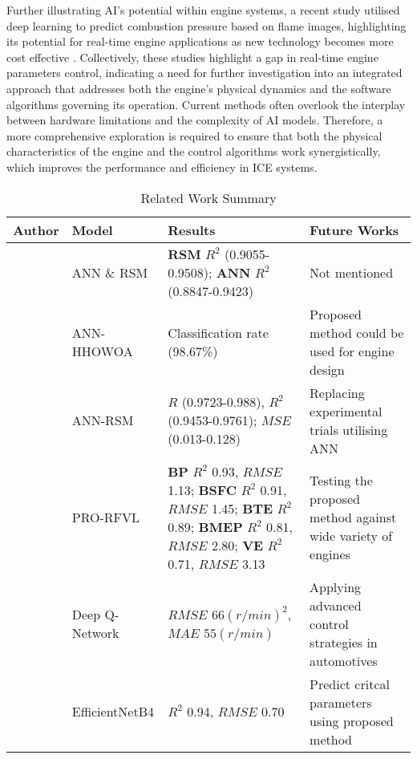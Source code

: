 \documentclass[a4paper, 12pt]{article}
\begin{document}
  Further illustrating AI's potential within engine systems, a recent study utilised deep learning to predict combustion pressure based on flame images, highlighting its potential for real-time engine applications as new technology becomes more cost effective \parencite{magedPredictionCombustionPressure2025}. Collectively, these studies highlight a gap in real-time engine parameters control, indicating a need for further investigation into an integrated approach that addresses both the engine's physical dynamics and the software algorithms governing its operation. Current methods often overlook the interplay between hardware limitations and the complexity of AI models. Therefore, a more comprehensive exploration is required to ensure that both the physical characteristics of the engine and the control algorithms work synergistically, which improves the performance and efficiency in ICE systems. \\

  \begin{table}[ht]
    \centering
    \caption{Related Work Summary}
    \label{tab:summary_table}
    \scalebox{0.80} {
      \begin{tabular}{p{4cm} p{3cm} p{4cm} p{4cm}} %
        \toprule
        \textbf{Author} & \textbf{Model} & \textbf{Results} & \textbf{Future Works} \\
        \midrule
        \parencite{usluOptimizationDieselEngine2020} & ANN \& RSM & $\textbf{RSM}$ $R^2$ (0.9055-0.9508); $\textbf{ANN}$ $R^2$ (0.8847-0.9423) & Not mentioned \\
        \parencite{singhSampleddataModelValidation2020} & ANN-HHOWOA & Classification rate (98.67\%) & Proposed method could be used for engine design \\
        \parencite{sharmaApplicationMachineLearning2023} & ANN-RSM & $R$ (0.9723-0.988), $R^2$ (0.9453-0.9761); $MSE$ (0.013-0.128) & Replacing experimental trials utilising ANN \\
        \parencite{dekaOptimisingNovelMethanol2024} & PRO-RFVL & $\textbf{BP}$ $R^2$ 0.93, $RMSE$ 1.13; \textbf{BSFC} $R^2$ 0.91, $RMSE$ 1.45; \textbf{BTE} $R^2$ 0.89; \textbf{BMEP} $R^2$ 0.81, $RMSE$ 2.80; \textbf{VE} $R^2$ 0.71, $RMSE$ 3.13 & Testing the proposed method against wide variety of engines \\
        \parencite{omranDeepReinforcementLearning2024} & Deep Q-Network & $RMSE$ $66 (r/min)^2$, $MAE$ $55 (r/min)$ & Applying advanced control strategies in automotives \\
        \parencite{magedPredictionCombustionPressure2025} & EfficientNetB4 & $R^2$ 0.94, $RMSE$ 0.70 & Predict critcal parameters using proposed method \\
        \bottomrule
      \end{tabular}
      }
  \end{table}
\end{document}
